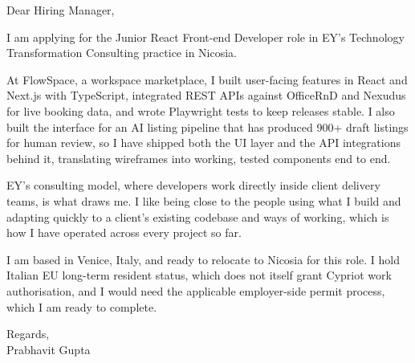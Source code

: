 \documentclass[a4paper,11pt]{article}
\begin{document}
Dear Hiring Manager,

I am applying for the Junior React Front-end Developer role in EY's Technology Transformation Consulting practice in Nicosia.

At FlowSpace, a workspace marketplace, I built user-facing features in React and Next.js with TypeScript, integrated REST APIs against OfficeRnD and Nexudus for live booking data, and wrote Playwright tests to keep releases stable. I also built the interface for an AI listing pipeline that has produced 900+ draft listings for human review, so I have shipped both the UI layer and the API integrations behind it, translating wireframes into working, tested components end to end.

EY's consulting model, where developers work directly inside client delivery teams, is what draws me. I like being close to the people using what I build and adapting quickly to a client's existing codebase and ways of working, which is how I have operated across every project so far.

I am based in Venice, Italy, and ready to relocate to Nicosia for this role. I hold Italian EU long-term resident status, which does not itself grant Cypriot work authorisation, and I would need the applicable employer-side permit process, which I am ready to complete.

Regards,\\
Prabhavit Gupta
\end{document}
